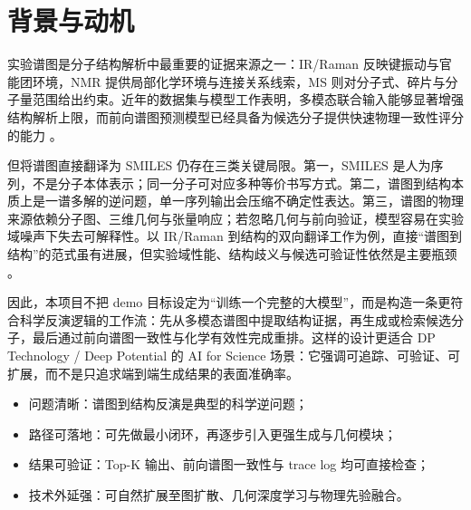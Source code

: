 \section{背景与动机}
实验谱图是分子结构解析中最重要的证据来源之一：IR/Raman 反映键振动与官能团环境，NMR 提供局部化学环境与连接关系线索，MS 则对分子式、碎片与分子量范围给出约束。近年的数据集与模型工作表明，多模态联合输入能够显著增强结构解析上限，而前向谱图预测模型已经具备为候选分子提供快速物理一致性评分的能力 \citep{Alberts2024MultimodalDataset,RocabertOriols2025VibraCLIP,Zou2023DetaNet}。

但将谱图直接翻译为 SMILES 仍存在三类关键局限。第一，SMILES 是人为序列，不是分子本体表示；同一分子可对应多种等价书写方式。第二，谱图到结构本质上是一谱多解的逆问题，单一序列输出会压缩不确定性表达。第三，谱图的物理来源依赖分子图、三维几何与张量响应；若忽略几何与前向验证，模型容易在实验域噪声下失去可解释性。以 IR/Raman 到结构的双向翻译工作为例，直接“谱图到结构”的范式虽有进展，但实验域性能、结构歧义与候选可验证性依然是主要瓶颈 \citep{Hu2025TranSpec,Alberts2024IRStructure}。

因此，本项目不把 demo 目标设定为“训练一个完整的大模型”，而是构造一条更符合科学反演逻辑的工作流：先从多模态谱图中提取结构证据，再生成或检索候选分子，最后通过前向谱图一致性与化学有效性完成重排。这样的设计更适合 DP Technology / Deep Potential 的 AI for Science 场景：它强调可追踪、可验证、可扩展，而不是只追求端到端生成结果的表面准确率。

\begin{keybox}
\begin{itemize}
  \item 问题清晰：谱图到结构反演是典型的科学逆问题；
  \item 路径可落地：可先做最小闭环，再逐步引入更强生成与几何模块；
  \item 结果可验证：Top-K 输出、前向谱图一致性与 trace log 均可直接检查；
  \item 技术外延强：可自然扩展至图扩散、几何深度学习与物理先验融合。
\end{itemize}
\end{keybox}

